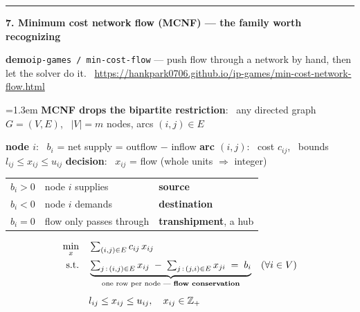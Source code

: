 \documentclass[10pt]{article}
\newcommand{\beat}[2]{%
  \par\medskip\needspace{8\baselineskip}%
  {\color{ruleink}\rule{\textwidth}{1pt}}\par\nobreak\vspace{2pt}
  {\large\bfseries #1.\; #2}\par\nobreak\vspace{3pt}}
\newenvironment{board}{%
  \par\vspace{2pt}
  \begingroup\leftskip=1.3em\relax}{%
  \par\endgroup\vspace{2pt}}
\newcommand{\demo}[2]{\par{\leavevmode\color{demoink}\small\textbf{demo}\quad\texttt{#1} --- #2}\par}
\begin{document}
\beat{7}{Minimum cost network flow (MCNF) --- the family worth recognizing}
\demo{ip-games / min-cost-flow}{push flow through a network by hand, then let the solver do it. \ \url{https://hankpark0706.github.io/ip-games/min-cost-network-flow.html}}
\begin{board}
\textbf{MCNF drops the bipartite restriction}: \ any directed graph $G = (V,E)$, \ $|V| = m$ nodes, arcs $(i,j) \in E$
\vspace{2pt}

\textbf{node $i$}: \ $b_i$ = net supply = outflow $-$ inflow \qquad\quad
\textbf{arc $(i,j)$}: \ cost $c_{ij}$, \ bounds $l_{ij} \le x_{ij} \le u_{ij}$ \quad
\textbf{decision}: \ $x_{ij}$ = flow (whole units $\Rightarrow$ integer)
\begin{center}
\begin{tabular}{@{}l|l|l@{}}
 $b_i > 0$ & node $i$ supplies & \textbf{source} \\[2pt]
 $b_i < 0$ & node $i$ demands & \textbf{destination} \\[2pt]
 $b_i = 0$ & flow only passes through & \textbf{transhipment}, a hub \\
\end{tabular}
\end{center}
\[
\begin{aligned}
  \min_{x}\quad & \textstyle\sum_{(i,j) \in E} c_{ij}\, x_{ij} \\
  \text{s.t.}\quad
    & \underbrace{\textstyle\sum_{j \,:\, (i,j) \in E} x_{ij} \;-\; \sum_{j \,:\, (j,i) \in E} x_{ji} \;=\; b_i}
        _{\text{one row per node --- \textbf{flow conservation}}}
      \quad (\forall i \in V) \\[4pt]
    & l_{ij} \le x_{ij} \le u_{ij}, \quad x_{ij} \in \mathbb{Z}_{+}
\end{aligned}
\]
\end{board}
\end{document}

